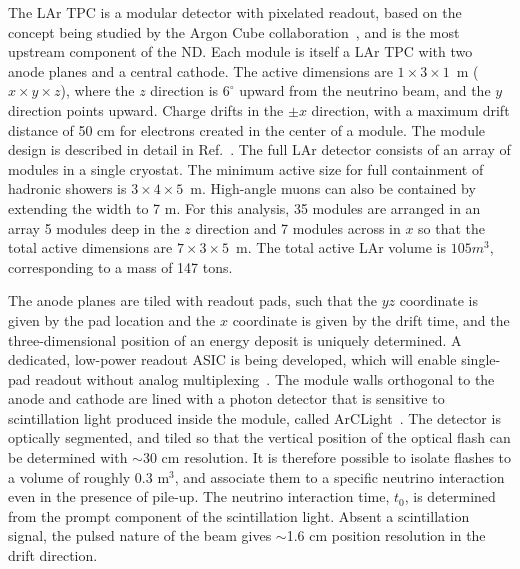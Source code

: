 The LAr TPC is a modular detector with pixelated readout, based on the concept being studied by the Argon Cube collaboration~\cite{ArgonCube}, and is the most upstream component of the ND. Each module is itself a LAr TPC with two anode planes and a central cathode. The active dimensions are $1 \times 3 \times 1$~m ($x \times y \times z$), where the $z$ direction is $6^{\circ}$ upward from the neutrino beam, and the $y$ direction points upward. Charge drifts in the $\pm x$ direction, with a maximum drift distance of 50 cm for electrons created in the center of a module. The module design is described in detail in Ref.~\cite{ArgonCube}. The full LAr detector consists of an array of modules in a single cryostat. The minimum active size for full containment of hadronic showers is $3 \times 4 \times 5$~m. High-angle muons can also be contained by extending the width to 7 m. For this analysis, 35 modules are arranged in an array 5 modules deep in the $z$ direction and 7 modules across in $x$ so that the total active dimensions are $7 \times 3 \times 5$~m. The total active LAr volume is $105 m^{3}$, corresponding to a mass of 147 tons.

The anode planes are tiled with readout pads, such that the $yz$ coordinate is given by the pad location and the $x$ coordinate is given by the drift time, and the three-dimensional position of an energy deposit is uniquely determined. A dedicated, low-power readout ASIC is being developed, which will enable single-pad readout without analog multiplexing~\cite{LArPix}. The module walls orthogonal to the anode and cathode are lined with a photon detector that is sensitive to scintillation light produced inside the module, called ArCLight~\cite{ArCLight}. The detector is optically segmented, and tiled so that the vertical position of the optical flash can be determined with $\sim$30 cm resolution. It is therefore possible to isolate flashes to a volume of roughly 0.3 m$^{3}$, and associate them to a specific neutrino interaction even in the presence of pile-up. The neutrino interaction time, $t_{0}$, is determined from the prompt component of the scintillation light. Absent a scintillation signal, the pulsed nature of the beam gives $\sim$1.6 cm position resolution in the drift direction.

